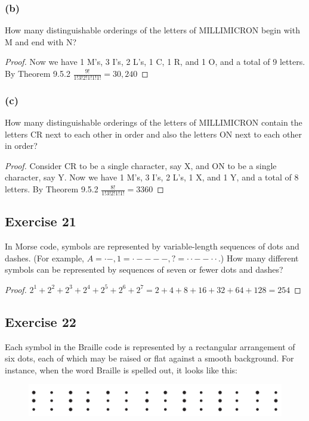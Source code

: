 \documentclass[14pt]{extarticle}
\begin{document}
\subsubsection{(b)}
How many distinguishable orderings of the letters of MILLIMICRON begin with M and end with N?

\begin{proof}
     Now we have 1 M's, 3 I's, 2 L's, 1 C, 1 R, and 1 O, and a total of 9 letters. By Theorem 9.5.2
     \(\frac{9!}{1!3!2!1!1!1!} = 30,240\)
\end{proof}

\subsubsection{(c)}
How many distinguishable orderings of the letters of MILLIMICRON contain the letters CR next to each other in
order and also the letters ON next to each other in order?

\begin{proof}
     Consider CR to be a single character, say X, and ON to be a single character, say Y. Now we have 1 M's, 3 I's, 2 L's, 1 X,
     and 1 Y, and a total of 8 letters. By Theorem 9.5.2
     \(\frac{8!}{1!3!2!1!1!} = 3360\)
\end{proof}

\subsection{Exercise 21}
In Morse code, symbols are represented by variable-length sequences of dots and dashes. (For example, \(A = \cdot -,
1 = \cdot - - - -, ? = \cdot \cdot - - \cdot \cdot\).) How many different symbols can be represented by sequences of
seven or fewer dots and dashes?

\begin{proof}
     \(2^1 + 2^2 + 2^3 + 2^4 + 2^5 + 2^6 + 2^7 = 2 + 4 + 8 + 16 + 32 + 64 + 128 = 254\)
\end{proof}

\subsection{Exercise 22}
Each symbol in the Braille code is represented by a rectangular arrangement of six dots, each of which may be raised or flat against a smooth background. For instance, when the word Braille is spelled out, it looks like this:

\begin{figure}[ht!]
     \centering
     \includegraphics[scale=0.5]{../images/9.5.22.png}
\end{figure}
\end{document}
